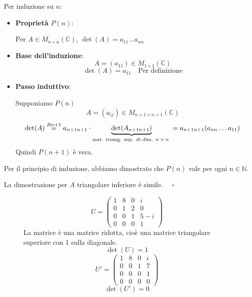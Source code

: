 \documentclass[a4paper]{article}
\theoremstyle{break}
\theoremstyle{break}
\theoremstyle{break}
\theoremstyle{break}
\begin{document}
\noindent Per induzione su \( n \):
\begin{itemize}
  \item \textbf{Proprietà \( P(n) \)}:

    Per \( A \in M_{n \times n}(\mathbb{C}) \), \( \det(A) = a_{11} \ldots a_{nn} \) 

  \item \textbf{Base dell'induzione}:
    \[
    A = (a_{11}) \in M_{1 \times 1}(\mathbb{C})
    \] 
    \[
    \det(A) = a_{11} \quad \text{Per definizione}
    \] 
  \item \textbf{Passo induttivo}:

    Supponiamo \( P(n) \) 
    \[
      A = (a_{ij}) \in M_{n+1 \times n+1}(\mathbb{C})
    \] 
    \[
      \det(A) \stackrel{Rn+1}{=} a_{n+1n+1} \cdot \underbrace{\det(A_{n+1n+1})}_{
        \text{mat. triang. sup. di dim. \( n \times n \) }
      } = a_{n+1n+1} (a_{nn}\ldots a_{11})
    \] 
    Quindi \( P(n+1) \) è vera.
\end{itemize}
Per il principio di induzione, abbiamo dimostrato che \( P(n) \) vale per ogni \( n \in \mathbb{N} \).

\noindent La dimostrazione per \( A \) triangolare inferiore è simile. \( \quad \square \) 

\begin{figure}[H]
  \begin{example}
    \[
      U = \begin{pmatrix} 
        1 & 8 & 0 & i\\
        0 & 1 & 2 & 0\\
        0 & 0 & 1 & 5-i\\
        0 & 0 & 0 & 1
      \end{pmatrix} 
    \] 
    La matrice è una matrice ridotta, cioè una matrice triangolare superiore con 1 sulla
    diagonale.
    \[
    \det(U) = 1
    \] 
    \[
    U' = \begin{pmatrix} 
      1 & 8 & 0 & i\\
      0 & 0 & 1 & 7\\
      0 & 0 & 0 & 1\\
      0 & 0 & 0 & 0
    \end{pmatrix} 
    \] 
    \[
    \det(U') = 0
    \] 
  \end{example}
\end{figure}
\end{document}
